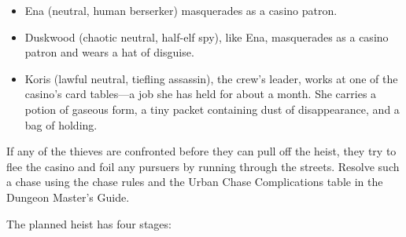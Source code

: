 \documentclass[10pt,a4paper,twoside,twocolumn,openany,nodeprecatedcode]{dndbook}
\begin{document}
\begin{itemize}
\item Ena (neutral, human berserker) masquerades as a casino patron.
\item Duskwood (chaotic neutral, half-elf spy), like Ena, masquerades as a casino patron and wears a hat of disguise.
\item Koris (lawful neutral, tiefling assassin), the crew's leader, works at one of the casino's card tables—a job she has held for about a month. She carries a potion of gaseous form, a tiny packet containing dust of disappearance, and a bag of holding.
\end{itemize}

If any of the thieves are confronted before they can pull off the heist, they try to flee the casino and foil any pursuers by running through the streets. Resolve such a chase using the chase rules and the Urban Chase Complications table in the Dungeon Master's Guide.


The planned heist has four stages:
\end{document}

